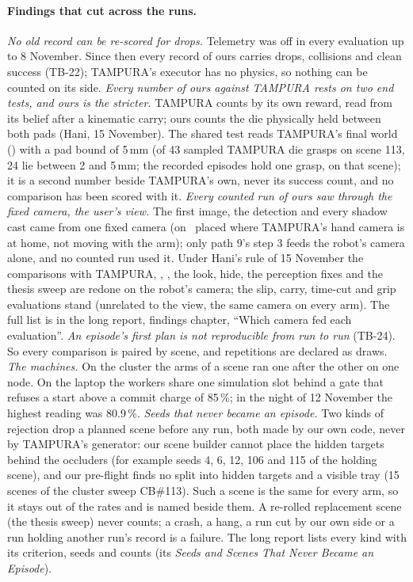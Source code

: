 \paragraph{Findings that cut across the runs.}
\emph{No old record can be re-scored for drops.} Telemetry was off in every evaluation up to 8 November. Since
then every record of ours carries drops, collisions and clean success (TB-22); TAMPURA's executor has no
physics, so nothing can be counted on its side.
\emph{Every number of ours against TAMPURA rests on two end tests, and ours is the stricter.} TAMPURA counts by
its own reward, read from its belief after a kinematic carry; ours counts the die physically held between both pads
(Hani, 15 November). The shared test reads TAMPURA's final world () with a pad bound of 5\,mm (of 43 sampled
TAMPURA die grasps on scene 113, 24 lie between 2 and 5\,mm; the recorded episodes hold one grasp, on that scene); it is
a second number beside TAMPURA's own, never its success count, and no comparison has been scored with it.
\emph{Every counted run of ours saw through the fixed camera, the user's view.} The first image, the detection and
every shadow cast came from one fixed camera (on \fdice\ placed where TAMPURA's hand camera is at home, not moving with
the arm); only path 9's step 3 feeds the robot's camera alone, and no counted run used it. Under Hani's rule of 15
November the comparisons with TAMPURA, , , the look, hide, the perception fixes and the thesis sweep are
redone on the robot's camera; the slip, carry, time-cut and grip evaluations stand (unrelated to the view, the same
camera on every arm). The full list is in the long report, findings chapter, ``Which camera fed each evaluation''.
\emph{An episode's first plan is not reproducible from run to run} (TB-24). So every comparison is paired by
scene, and repetitions are declared as draws.
\emph{The machines.} On the cluster the arms of a scene ran one after the other on one node. On the laptop the
workers share one simulation slot behind a gate that refuses a start above a commit charge of 85\,\%; in the
night of 12 November the highest reading was 80.9\,\%.
\emph{Seeds that never became an episode.} Two kinds of rejection drop a planned scene before any run, both made by
our own code, never by TAMPURA's generator: our scene builder cannot place the hidden targets behind the occluders
(for example seeds 4, 6, 12, 106 and 115 of the holding scene), and our pre-flight finds no split into hidden
targets and a visible tray (15 scenes of the cluster sweep CB\#113). Such a scene is the same for every arm, so it
stays out of the rates and is named beside them. A re-rolled replacement scene (the thesis sweep) never counts; a
crash, a hang, a run cut by our own side or a run holding another run's record is a failure. The long report
lists every kind with its criterion, seeds and counts (its \emph{Seeds and Scenes That Never Became an Episode}).

